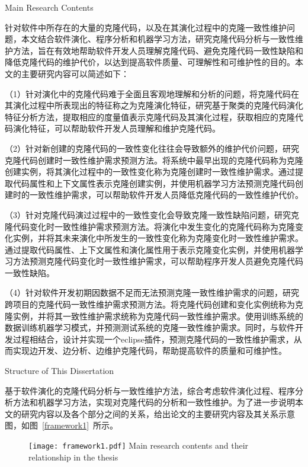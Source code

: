 {Main Research Contents}

针对软件中所存在的大量的克隆代码，以及在其演化过程中的克隆一致性维护问题，本文结合软件演化、程序分析和机器学习方法，研究克隆代码分析与一致性维护方法，旨在有效地帮助软件开发人员理解克隆代码、避免克隆代码一致性缺陷和降低克隆代码的维护代价，以达到提高软件质量、可理解性和可维护性的目的。本文的主要研究内容可以简述如下：

（1）针对演化中的克隆代码难于全面且客观地理解和分析的问题，将克隆代码在其演化过程中所表现出的特征称之为克隆演化特征，研究基于聚类的克隆代码演化特征分析方法，提取相应的度量值表示克隆代码及其演化过程，获取相应的克隆代码演化特征，可以帮助软件开发人员理解和维护克隆代码。

（2）针对新创建的克隆代码的一致性变化往往会导致额外的维护代价问题，研究克隆代码创建时一致性维护需求预测方法。将系统中最早出现的克隆代码称为克隆创建实例，将其演化过程中的一致性变化称为克隆创建时一致性维护需求。通过提取代码属性和上下文属性表示克隆创建实例，并使用机器学习方法预测克隆代码创建时的一致性维护需求，可以帮助软件开发人员降低克隆代码的一致性维护代价。

（3）针对克隆代码演过过程中的一致性变化会导致克隆一致性缺陷问题，研究克隆代码变化时一致性维护需求预测方法。将演化中发生变化的克隆代码称为克隆变化实例，并将其未来演化中所发生的一致性变化称为克隆变化时一致性维护需求。通过提取代码属性、上下文属性和演化属性用于表示克隆变化实例，并使用机器学习方法预测克隆代码变化时一致性维护需求，可以帮助程序开发人员避免克隆代码一致性缺陷。

（4）针对软件开发初期因数据不足而无法预测克隆一致性维护需求的问题，研究跨项目的克隆代码一致性维护需求预测方法。将克隆代码创建和变化实例统称为克隆实例，并将其一致性维护需求统称为克隆代码一致性维护需求。使用训练系统的数据训练机器学习模式，并预测测试系统的克隆一致性维护需求。同时，与软件开发过程相结合，设计并实现一个eclipse插件，预测克隆代码的一致性维护需求，从而实现边开发、边分析、边维护克隆代码，帮助提高软件的质量和可维护性。

{Structure of This Dissertation}

基于软件演化的克隆代码分析与一致性维护方法，综合考虑软件演化过程、程序分析方法和机器学习方法，实现对克隆代码的分析和一致性维护。为了进一步说明本文的研究内容以及各个部分之间的关系，给出论文的主要研究内容及其关系示意图，如图~\ref{framework1}~所示。

\begin{figure}[htbp]
\centering
\texttt{[image: framework1.pdf]}
{Main research contents and their relationship in the thesis}
\vspace{-1em}
\end{figure}

